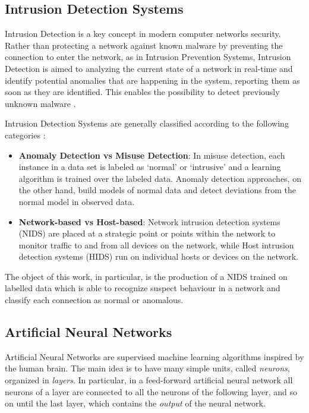 \subsection{Intrusion Detection Systems}

Intrusion Detection is a key concept in modern computer networks security. Rather than protecting a network against known malware by preventing the connection to enter the network, as in Intrusion Prevention Systems, Intrusion Detection is aimed to analyzing the current state of a network in real-time and identify potential anomalies that are happening in the system, reporting them as soon as they are identified. This enables the possibility to detect previously unknown malware \cite{ids}.

Intrusion Detection Systems are generally classified according to the following categories \cite{idsclass}:

\begin{itemize}
    \item \textbf{Anomaly Detection vs Misuse Detection}:  In misuse detection, each instance in a data set is labeled as ‘normal’ or ‘intrusive’ and a learning algorithm is trained over the labeled data. Anomaly detection approaches, on the other hand, build models of normal data and detect deviations from the normal model in observed data.
    \item  \textbf{Network-based vs Host-based}: Network intrusion detection systems (NIDS) are placed at a strategic point or points within the network to monitor traffic to and from all devices on the network, while Host intrusion detection systems (HIDS) run on individual hosts or devices on the network.
\end{itemize}

The object of this work, in particular, is the production of a NIDS trained on labelled data which is able to recognize suspect behaviour in a network and classify each connection as normal or anomalous.

\subsection{Artificial Neural Networks}

Artificial Neural Networks are supervised machine learning algorithms inspired by the human brain. The main idea is to have many simple units, called \textit{neurons}, organized in \textit{layers}. In particular, in a feed-forward artificial neural network all neurons of a layer are connected to all the neurons of the following layer, and so on until the last layer, which contains the \textit{output} of the neural network.

